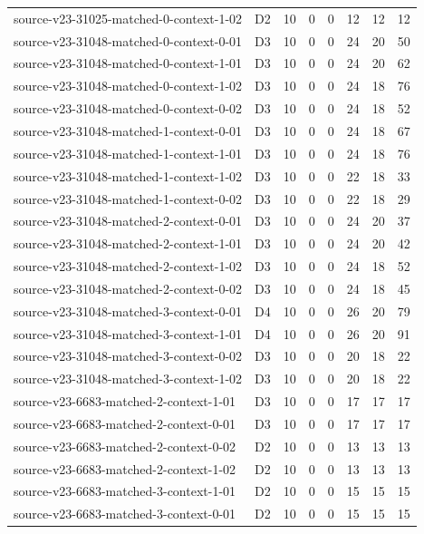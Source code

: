 \begin{longtable}{p{}lrrrrrr}
source-v23-31025-matched-0-context-1-02 & D2 & 10 & 0 & 0 & 12 & 12 & 12\\
source-v23-31048-matched-0-context-0-01 & D3 & 10 & 0 & 0 & 24 & 20 & 50\\
source-v23-31048-matched-0-context-1-01 & D3 & 10 & 0 & 0 & 24 & 20 & 62\\
source-v23-31048-matched-0-context-1-02 & D3 & 10 & 0 & 0 & 24 & 18 & 76\\
source-v23-31048-matched-0-context-0-02 & D3 & 10 & 0 & 0 & 24 & 18 & 52\\
source-v23-31048-matched-1-context-0-01 & D3 & 10 & 0 & 0 & 24 & 18 & 67\\
source-v23-31048-matched-1-context-1-01 & D3 & 10 & 0 & 0 & 24 & 18 & 76\\
source-v23-31048-matched-1-context-1-02 & D3 & 10 & 0 & 0 & 22 & 18 & 33\\
source-v23-31048-matched-1-context-0-02 & D3 & 10 & 0 & 0 & 22 & 18 & 29\\
source-v23-31048-matched-2-context-0-01 & D3 & 10 & 0 & 0 & 24 & 20 & 37\\
source-v23-31048-matched-2-context-1-01 & D3 & 10 & 0 & 0 & 24 & 20 & 42\\
source-v23-31048-matched-2-context-1-02 & D3 & 10 & 0 & 0 & 24 & 18 & 52\\
source-v23-31048-matched-2-context-0-02 & D3 & 10 & 0 & 0 & 24 & 18 & 45\\
source-v23-31048-matched-3-context-0-01 & D4 & 10 & 0 & 0 & 26 & 20 & 79\\
source-v23-31048-matched-3-context-1-01 & D4 & 10 & 0 & 0 & 26 & 20 & 91\\
source-v23-31048-matched-3-context-0-02 & D3 & 10 & 0 & 0 & 20 & 18 & 22\\
source-v23-31048-matched-3-context-1-02 & D3 & 10 & 0 & 0 & 20 & 18 & 22\\
source-v23-6683-matched-2-context-1-01 & D3 & 10 & 0 & 0 & 17 & 17 & 17\\
source-v23-6683-matched-2-context-0-01 & D3 & 10 & 0 & 0 & 17 & 17 & 17\\
source-v23-6683-matched-2-context-0-02 & D2 & 10 & 0 & 0 & 13 & 13 & 13\\
source-v23-6683-matched-2-context-1-02 & D2 & 10 & 0 & 0 & 13 & 13 & 13\\
source-v23-6683-matched-3-context-1-01 & D2 & 10 & 0 & 0 & 15 & 15 & 15\\
source-v23-6683-matched-3-context-0-01 & D2 & 10 & 0 & 0 & 15 & 15 & 15\\

\end{longtable}
